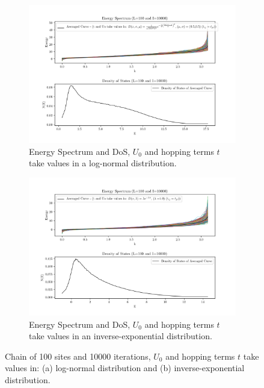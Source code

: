 \documentclass[12pt]{article}
\begin{document}
\begin{figure}[ht]
		\centering
        \begin{subfigure}[a]{\textwidth}
        		\centering
                \includegraphics[scale=0.65]{EDOSRoRL.png}
                \caption{Energy Spectrum and DoS, $U_{0}$ and hopping terms $t$ take values in a log-normal distribution.}
                \label{f7a}
        \end{subfigure}
        \begin{subfigure}[b]{\textwidth}
        		\centering
                \includegraphics[scale=0.65]{EDOSRoRE.png}
                \caption{ Energy Spectrum and DoS, $U_{0}$ and hopping terms $t$ take values in an inverse-exponential distribution.}
                \label{f7b}
        \end{subfigure}
        \caption{Chain of 100 sites and 10000 iterations, $U_{0}$ and hopping terms $t$ take values in: (a) log-normal distribution and (b) inverse-exponential distribution.}
        \label{f7}
\end{figure}
\end{document}
